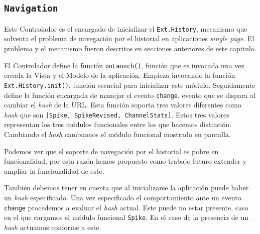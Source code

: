 	\subsection{\texttt{Navigation}}
		Este Controlador es el encargado de inicializar el \texttt{Ext.History}, mecanismo que solventa el problema de navegación por el
		historial en aplicaciones \emph{single page}. El problema y el mecanismo fueron descritos en secciones anteriores de este capitulo.
		\par
		El Controlador define la función \texttt{onLaunch()}, función que es invocada una vez creada la Vista y el Modelo de la aplicación.
		Empieza invocando la función \texttt{Ext.History.init()}, función esencial para inicializar este módulo. Seguidamente define la
		función encargada de manejar el evento \texttt{change}, evento que se dispara al cambiar el \emph{hash} de la URL. Esta función
		soporta tres valores diferentes como \emph{hash} que son \texttt{[Spike, SpikeRevised, ChannelStats]}. Estos tres valores representan
		los tres módulos funcionales entre los que hacemos distinción.  Cambiando el \emph{hash} cambiamos el módulo funcional mostrado en
		pantalla.
		\par
		Podemos ver que el soporte de navegación por el historial es pobre en funcionalidad, por esta razón hemos propuesto como trabajo
		futuro extender y ampliar la funcionalidad de este.
		\par
		También debemos tener en cuenta que al inicializarse la aplicación puede haber un \emph{hash} especificado. Una vez especificado el
		comportamiento ante un evento \texttt{change} procedemos a evaluar el \emph{hash} actual. Este puede no estar presente, caso en el que
		cargamos el módulo funcional \texttt{Spike}. En el caso de la presencia de un \emph{hash} actuamos conforme a este.
